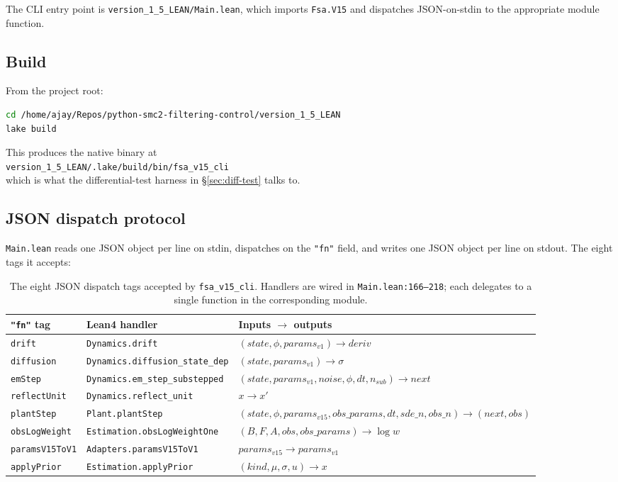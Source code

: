 \documentclass[11pt,a4paper]{article}
\begin{document}
The CLI entry point is \texttt{version\_1\_5\_LEAN/Main.lean}, which
imports \texttt{Fsa.V15} and dispatches JSON-on-stdin to the
appropriate module function.

\subsection{Build}

From the project root:

\begin{lstlisting}[language=bash]
cd /home/ajay/Repos/python-smc2-filtering-control/version_1_5_LEAN
lake build
\end{lstlisting}

This produces the native binary at\\
\texttt{version\_1\_5\_LEAN/.lake/build/bin/fsa\_v15\_cli}\\
which is what the differential-test harness in
\S\ref{sec:diff-test} talks to.

\subsection{JSON dispatch protocol}

\texttt{Main.lean} reads one JSON object per line on stdin, dispatches
on the \texttt{"fn"} field, and writes one JSON object per line on
stdout. The eight tags it accepts:

\begin{table}[ht]
\centering
\small
\begin{tabular}{lll}
\toprule
\texttt{"fn"} tag       & Lean4 handler                         & Inputs $\to$ outputs \\
\midrule
\texttt{drift}          & \texttt{Dynamics.drift}               & $(state, \phi, params_{v1}) \to deriv$ \\
\texttt{diffusion}      & \texttt{Dynamics.diffusion\_state\_dep} & $(state, params_{v1}) \to \sigma$ \\
\texttt{emStep}         & \texttt{Dynamics.em\_step\_substepped} & $(state, params_{v1}, noise, \phi, dt, n_{sub}) \to next$ \\
\texttt{reflectUnit}    & \texttt{Dynamics.reflect\_unit}       & $x \to x'$ \\
\texttt{plantStep}      & \texttt{Plant.plantStep}              & $(state, \phi, params_{v15}, obs\_params, dt, sde\_n, obs\_n) \to (next, obs)$ \\
\texttt{obsLogWeight}   & \texttt{Estimation.obsLogWeightOne}   & $(B, F, A, obs, obs\_params) \to \log w$ \\
\texttt{paramsV15ToV1}  & \texttt{Adapters.paramsV15ToV1}       & $params_{v15} \to params_{v1}$ \\
\texttt{applyPrior}     & \texttt{Estimation.applyPrior}        & $(kind, \mu, \sigma, u) \to x$ \\
\bottomrule
\end{tabular}
\caption{The eight JSON dispatch tags accepted by \texttt{fsa\_v15\_cli}.
Handlers are wired in \texttt{Main.lean:166--218}; each delegates to a
single function in the corresponding module.}
\label{tab:dispatch}
\end{table}
\end{document}
